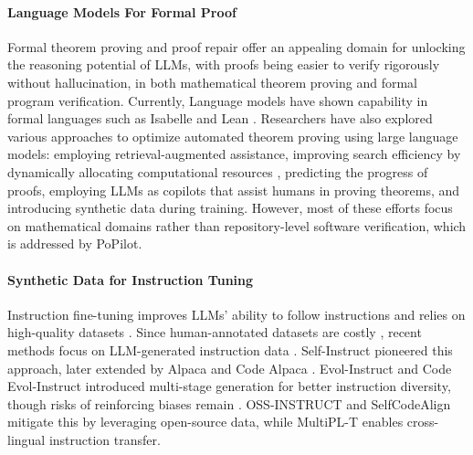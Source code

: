 \paragraph{Language Models For Formal Proof}
Formal theorem proving and proof repair offer an appealing domain for unlocking the reasoning potential of LLMs, with proofs being easier to verify rigorously without hallucination\cite{yang2023leandojo}, in both mathematical theorem proving and formal program verification. Currently, Language models have shown capability in formal languages such as Isabelle\cite{jiang2022thor,wang2023lego,zhao2023decomposing} and Lean \cite{polu2022formal,han2021proof,yang2023leandojo}. Researchers have also explored various approaches to optimize automated theorem proving using large language models: employing retrieval-augmented assistance\cite{yang2023leandojo}, improving search efficiency by dynamically allocating computational resources \cite{wang2023dt}, predicting the progress of proofs\cite{huang2025leanprogress}, employing LLMs as copilots that assist humans in proving theorems\cite{song2024towards, kozyrev2024coqpilot}, and introducing synthetic data during training\cite{wang2020learning, xin2024deepseek, lin2025goedel, wu2024internlm2}. However, most of these efforts focus on mathematical domains rather than repository-level software verification, which is addressed by PoPilot.

\paragraph{Synthetic Data for Instruction Tuning}
Instruction fine-tuning improves LLMs' ability to follow instructions and relies on high-quality datasets \cite{zhou2024lima,wang2022self}. Since human-annotated datasets are costly \cite{instructgpt2022,kopf2024openassistant,zheng2024lmsyschat1mlargescalerealworldllm}, recent methods focus on LLM-generated instruction data \cite{wang2022self,gunasekar2023textbooks,wang2024codeclm,xu2024magpie}. Self-Instruct \cite{wang2022self} pioneered this approach, later extended by Alpaca \cite{alpaca} and Code Alpaca \cite{codealpaca}. Evol-Instruct \cite{xu2023wizardlm,ahn2024large} and Code Evol-Instruct \cite{luo2023wizardcoder} introduced multi-stage generation for better instruction diversity, though risks of reinforcing biases remain \cite{yu2024large}. OSS-INSTRUCT \cite{wei2024magicoder} and SelfCodeAlign \cite{wei2024selfcodealign} mitigate this by leveraging open-source data, while MultiPL-T \cite{cassano2024knowledge} enables cross-lingual instruction transfer.




